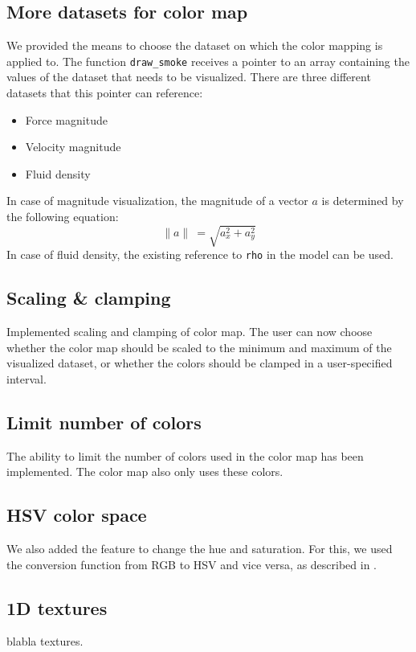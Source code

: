 	\subsection*{More datasets for color map}
		We provided the means to choose the dataset on which the color mapping is applied to.
		The function \texttt{draw\_smoke} receives a pointer to an array containing the values of the dataset that needs to be visualized.
		There are three different datasets that this pointer can reference:
		\begin{itemize}
			\item Force magnitude
			\item Velocity magnitude
			\item Fluid density
		\end{itemize}
		In case of magnitude visualization, the magnitude of a vector \(a\) is determined by the following equation:
		\[\| a \|\ = \sqrt{a_x^2 + a_y^2}\]
		In case of fluid density, the existing reference to \texttt{rho} in the model can be used.
	\subsection*{Scaling \& clamping}
		Implemented scaling and clamping of color map.
		The user can now choose whether the color map should be scaled to the minimum and maximum of the visualized dataset, or whether the colors should be clamped in a user-specified interval.
	\subsection*{Limit number of colors}
		The ability to limit the number of colors used in the color map has been implemented.
		The color map also only uses these colors.
	\subsection*{HSV color space}
		We also added the feature to change the hue and saturation.
		For this, we used the conversion function from RGB to HSV and vice versa, as described in \cite{telea2014data}.
	\subsection*{1D textures}
		blabla textures.